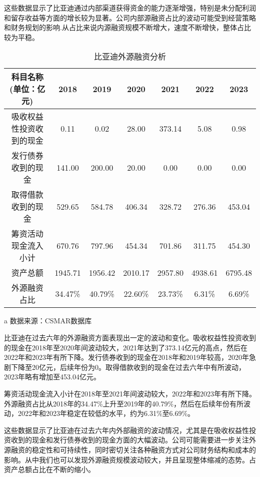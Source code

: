 这些数据显示了比亚迪通过内部渠道获得资金的能力逐渐增强，特别是未分配利润和留存收益等方面的增长较为显著。公司内部源融资占比的波动可能受到经营策略和财务规划的影响.从占比来说内源融资规模不断增大，速度不断增快，整体占比较为平稳。
\begin{table}
  \centering
  \begin{threeparttable}[c]
    \caption{比亚迪外源融资分析}
    \label{tab:capital-from-outside}
    \begin{tabular}{ccccccc}
      \toprule
        科目名称(单位：亿元) & 2018 & 2019 & 2020 & 2021 & 2022 & 2023 \\ 
      \midrule
        吸收权益性投资收到的现金 & 0.11  & 0.02  & 28.00  & 373.14  & 5.08  & 0.98  \\ 
        发行债券收到的现金 & 141.00  & 200.00  & 20.00  & 0.00  & 0.00  & 0.00  \\ 
        取得借款收到的现金 & 529.65  & 584.78  & 406.34  & 328.72  & 276.36  & 453.04  \\ 
        筹资活动现金流入小计 & 670.76  & 797.96  & 454.34  & 701.86  & 311.75  & 454.30  \\ 
        资产总额 & 1945.71  & 1956.42  & 2010.17  & 2957.80  & 4938.61  & 6795.48  \\ 
        外源融资占比 & 34.47\% & 40.79\% & 22.60\% & 23.73\% & 6.31\% & 6.69\% \\ 
      \bottomrule
    \end{tabular}
    \begin{tablenotes}
      \item [a] 数据来源：CSMAR数据库
    \end{tablenotes}
  \end{threeparttable}
\end{table}

比亚迪在过去六年的外源融资方面表现出一定的波动和变化。吸收权益性投资收到的现金在2018年至2020年间波动较大，2021年达到了373.14亿元的高点，然后在2022年和2023年有所下降。发行债券收到的现金在2018年和2019年较高，2020年急剧下降至20亿元，后续年份为0。取得借款收到的现金在过去六年中有所波动，2023年略有增加至453.04亿元。

筹资活动现金流入小计在2018年至2021年间波动较大，2022年和2023年有所下降。外源融资占比从2018年的34.47\%上升至2019年的40.79\%，然后在后续年份有所波动，2022年和2023年稳定在较低的水平，约为6.31\%至6.69\%。

这些数据显示了比亚迪在过去六年内外部融资的波动情况，尤其是在吸收权益性投资收到的现金和发行债券收到的现金方面的大幅波动。公司可能需要进一步关注外源融资的稳定性和可持续性，同时密切关注各种融资方式对公司财务结构和成本的影响。从中我们也可以发现外源融资规模波动较大，并且呈现整体缩减的态势。占资产总额占比在不断的缩小。

